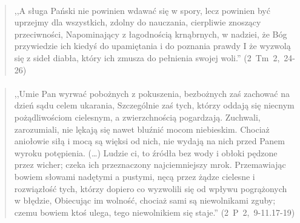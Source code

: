 \documentclass[10pt,a4paper,oneside]{article}
\begin{document}
\paragraph{}
\begin{quote}
,,A sługa Pański nie powinien wdawać się w spory, lecz powinien być uprzejmy dla wszystkich, zdolny do nauczania, cierpliwie znoszący przeciwności, Napominający z łagodnością krnąbrnych, w nadziei, że Bóg przywiedzie ich kiedyś do upamiętania i do poznania prawdy I że wyzwolą się z sideł diabła, który ich zmusza do pełnienia swojej woli.'' \mbox{(2 Tm 2, 24-26)}
\end{quote}
\paragraph{}
\begin{quote}
,,Umie Pan wyrwać pobożnych z pokuszenia, bezbożnych zaś zachować na dzień sądu celem ukarania, Szczególnie zaś tych, którzy oddają się niecnym pożądliwościom cielesnym, a zwierzchnością pogardzają. Zuchwali, zarozumiali, nie lękają się nawet bluźnić mocom niebieskim. Chociaż aniołowie siłą i mocą są więksi od nich, nie wydają na nich przed Panem wyroku potępienia. (\ldots) Ludzie ci, to źródła bez wody i obłoki pędzone przez wicher; czeka ich przeznaczony najciemniejszy mrok. Przemawiając bowiem słowami nadętymi a pustymi, nęcą przez żądze cielesne i rozwiązłość tych, którzy dopiero co wyzwolili się od wpływu pogrążonych w błędzie, Obiecując im wolność, chociaż sami są niewolnikami zguby; czemu bowiem ktoś ulega, tego niewolnikiem się staje.'' \mbox{(2 P 2, 9-11.17-19)}
\end{quote}
\end{document}
